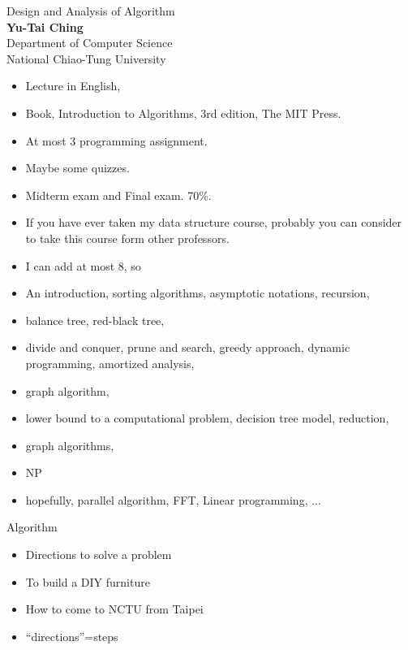 \documentclass{beamer}
\begin{document}
\begin{frame}{}
\vspace{1in}
\begin{center}
{\Large Design and Analysis of Algorithm\\}
{\bf Yu-Tai Ching\\}
{Department of Computer Science\\
National Chiao-Tung University}
\end{center}
\end{frame}

\begin{frame}{}
\begin{itemize}
\item Lecture in English, 
\item Book, Introduction to Algorithms, 3rd edition, The MIT Press. 
\item At most 3 programming assignment. 
\item Maybe some quizzes. 
\item Midterm exam and Final exam. 70\%. 
\item If you have ever taken my data structure course, probably you can consider to take this course form other professors. 
\item I can add at most 8, so
\end{itemize}
\end{frame}

\begin{frame}{}
\begin{itemize}
\item An introduction, sorting algorithms, asymptotic notations, recursion, 
\item balance tree, red-black tree, 
\item divide and conquer, prune and search, greedy approach, dynamic programming, amortized analysis,
\item graph algorithm,
\item lower bound to a computational problem, decision tree model, reduction,
\item graph algorithms, 
\item NP
\item hopefully, parallel algorithm, FFT, Linear programming, ...
\end{itemize}
\end{frame}

\begin{frame}{}
\begin{center}
{\large Algorithm}
\end{center}
\begin{itemize}
\item Directions to solve a problem
\item To build a DIY furniture
\item How to come to NCTU from Taipei
\item ``directions''=steps
\end{itemize}
\end{frame}
\end{document}
